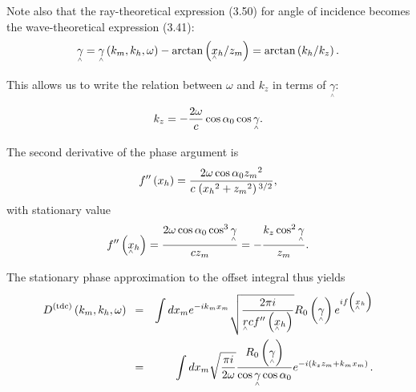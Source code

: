 Note also that the ray-theoretical expression (3.50) for angle of incidence becomes the wave-theoretical expression (3.41):
\begin{equation}\underset{{}^{\wedge}}{\gamma }=\underset{{}^{\wedge}}{\gamma }\left(\text{\textit{$k_m$}},\text{\textit{$k_h$}},\omega \right) -\text{arctan}\left(\text{\textit{$
$}}\text{\textit{$\underset{{}^{\wedge}}{x}{}_h/z_m$}}\right)=\text{arctan}\left(\text{\textit{$ $}}\text{\textit{$k_h /k_z$}}\right).\end{equation}

This allows us to write the relation between $\omega $ and \(k_z\) in terms of \(\underset{{}^{\wedge}}{\gamma }\):
\begin{equation}\text{\textit{$k_z$}}=-\frac{2\omega }{\text{\textit{$c$}}}\cos  \alpha _0 \cos  \underset{{}^{\wedge}}{\gamma }.\end{equation}

The second derivative of the phase argument is
\begin{equation}\text{\textit{$f^{\prime\prime}$}}\left(\text{\textit{$x_h$}}\right)=\frac{2\omega  \cos  \alpha _0\text{\textit{$ $}}\text{\textit{$z_m$}}{}^2
}{\text{\textit{$ $}}\text{\textit{$c$}}\text{\textit{$ $}}\left.\text{\textit{$($}}\text{\textit{$x_h$}}{}^2+\text{\textit{$z_m$}}{}^2\right){}^{3/2}},\end{equation}
with stationary value
\begin{equation}\text{\textit{$f^{\prime\prime}$}}\left(\text{\textit{$\underset{{}^{\wedge}}{x}{}_h$}}\right)=\frac{2\omega  \cos  \alpha _0\text{\textit{$
$}}\cos ^3 \underset{{}^{\wedge}}{\gamma }}{\text{\textit{$ c z_m$}}}=-\frac{\text{\textit{$k_z$}}\cos ^2 \underset{{}^{\wedge}}{\gamma }}{\text{\textit{$z_m$}}}.\end{equation}

The stationary phase approximation to the offset integral thus yields
\begin{eqnarray}
\text{\textit{$D$}}^{(\text{{tdc}})}\left(\text{\textit{$k_m$}},\text{\textit{$k_h$}},\omega \right)\text{  } & = & \int d\text{\textit{$x_m$}}e^{-i
\text{\textit{$\text{\textit{$k$}}_m$}}\text{\textit{$x_m$}}} \sqrt{\frac{2\pi  i}{\text{\textit{$\underset{{}^{\wedge}}{\text{\textit{$r$}}}$}}
\text{\textit{$cf^{\prime\prime}$}}\left(\text{\textit{$\underset{{}^{\wedge}}{x}{}_h$}}\right)}}\text{\textit{$R$}}_0\left(\underset{{}^{\wedge}}{\gamma
}\right) e^{i \text{\textit{$f$}}\left(\text{\textit{$\underset{{}^{\wedge}}{x}{}_h$}}\right)} \nonumber\\
& = &  \int d\text{\textit{$x_m$}}\sqrt{\frac{\pi  i }{2\omega  }}\frac{\text{\textit{$R$}}_0\left(\underset{{}^{\wedge}}{\gamma }\right)}{\cos  \underset{{}^{\wedge}}{\gamma
} \cos \text{\textit{$ $}}\alpha _0} e^{-i \left(\text{\textit{$k_zz_m$}}+\text{\textit{$\text{\textit{$k$}}_mx_m$}}\text{\textit{$)$}}\right.}.
\end{eqnarray}


